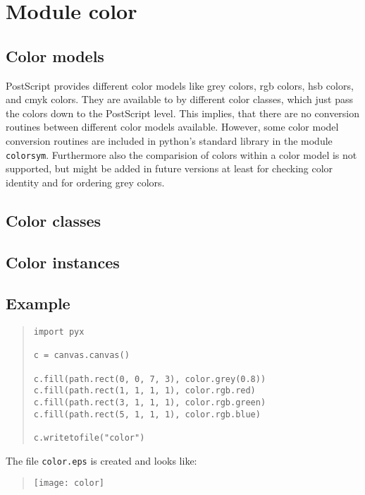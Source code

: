 \chapter{Module color}
\label{color}
\section{Color models}
PostScript provides different color models like grey colors, rgb
colors, hsb colors, and cmyk colors. They are available to \PyX{} by
different color classes, which just pass the colors down to the
PostScript level. This implies, that there are no conversion routines
between different color models available. However, some color model
conversion routines are included in python's standard library in the
module \texttt{colorsym}. Furthermore also the comparision of colors
within a color model is not supported, but might be added in future
versions at least for checking color identity and for ordering grey
colors.

\section{Color classes}

\section{Color instances}

\section{Example}
\begin{quote}
\begin{verbatim}
import pyx

c = canvas.canvas()

c.fill(path.rect(0, 0, 7, 3), color.grey(0.8))
c.fill(path.rect(1, 1, 1, 1), color.rgb.red)
c.fill(path.rect(3, 1, 1, 1), color.rgb.green)
c.fill(path.rect(5, 1, 1, 1), color.rgb.blue)

c.writetofile("color")
\end{verbatim}
\end{quote}

The file \verb|color.eps| is created and looks like:
\begin{quote}
\texttt{[image: color]}
\end{quote}
